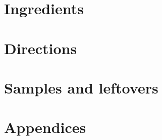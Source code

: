 \documentclass[10pt]{report}
\begin{document}








\part{Ingredients}
\label{part:ing}









\part{Directions}
\label{part:dir}



\part{Samples and leftovers}
\label{part:samp}






% 



\printbibliography

\appendix

\part{Appendices}



%

%

%

%


% 

% 

% 
\end{document}
